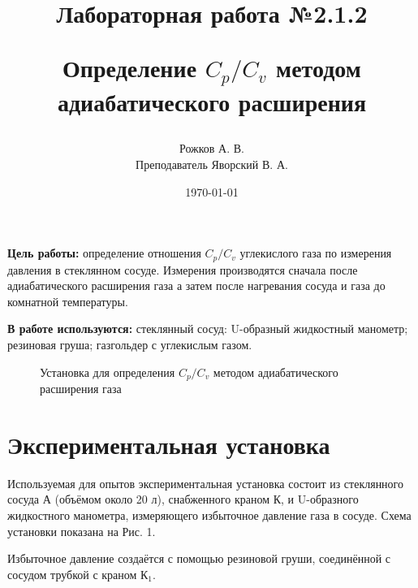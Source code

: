 \documentclass[a4paper, 12pt]{article}
\title{\begin{center}Лабораторная работа №2.1.2\end{center}
Определение $C_p / C_v$ методом адиабатического расширения}
\author{Рожков А. В. \\ Преподаватель Яворский В. А.}
\date{\today}
\begin{document}
    \maketitle
    \newpage

    \textbf{Цель работы:} определение отношения $C_p / C_v$ углекислого газа  по измерения давления в стеклянном сосуде. Измерения производятся сначала после адиабатического расширения газа а затем после нагревания сосуда и газа до комнатной температуры.

	\textbf{В работе используются:} стеклянный сосуд: U-образный жидкостный манометр; резиновая груша; газгольдер с углекислым газом.

	\begin{figure}[b!]	\label{plan2}

		\caption{Установка для определения $C_p / C_v$ методом адиабатического расширения газа}

	\end{figure}

	\section{Экспериментальная установка}

		Используемая для опытов экспериментальная установка состоит из стеклянного сосуда А (объёмом около 20 л), снабженного краном К, и U-образного жидкостного манометра, измеряющего избыточное давление газа в сосуде. Схема установки показана на Рис. 1.

		Избыточное давление создаётся с помощью резиновой груши, соединённой с сосудом трубкой с краном $К_1$.
\end{document}
